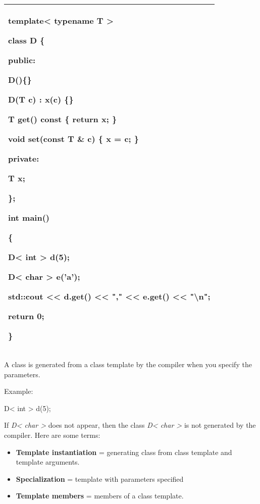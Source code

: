 \documentclass[
]{article}
\providecommand{\tightlist}{%
  \setlength{\itemsep}{0pt}\setlength{\parskip}{0pt}}
\begin{document}
\begin{longtable}[]{@{}l@{}}
\toprule
\endhead
\begin{minipage}[t]{0.97\columnwidth}\raggedright
template\textless{} typename T \textgreater{}

class D \{

public:

D()\{\}

D(T c) : x(c) \{\}

T get() const \{ return x; \}

void set(const T \& c) \{ x = c; \}

private:

T x;

\};

int main()

\{

\textbf{ D\textless{} int \textgreater{}} d(5);

\textbf{ D\textless{} char \textgreater{}} e('a');

std::cout \textless\textless{} d.get() \textless\textless{} ","
\textless\textless{} e.get() \textless\textless{} "\textbackslash n";

return 0;

\}\strut
\end{minipage}\tabularnewline
\bottomrule
\end{longtable}

A class is generated from a class template by the compiler when you
specify the parameters.

Example:

D\textless{} int \textgreater{} d(5);

If \emph{D\textless{} char \textgreater{}} does not appear, then the
class \emph{D\textless{} char \textgreater{}} is not generated by the
compiler. Here are some terms:

\begin{itemize}
\tightlist
\item
  \textbf{Template instantiation} = generating class from class template
  and template arguments.
\end{itemize}

\begin{itemize}
\tightlist
\item
  \textbf{Specialization} = template with parameters specified
\end{itemize}

\begin{itemize}
\tightlist
\item
  \textbf{Template members} = members of a class template.
\end{itemize}
\end{document}
